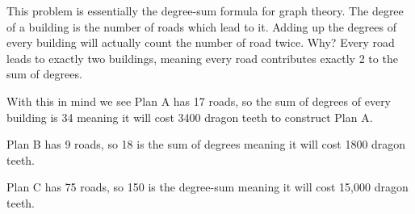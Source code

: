 


This problem is essentially the degree-sum formula for graph theory. The degree of a building is the number of roads which lead to it. Adding up the degrees of every building will actually count the number of road twice. Why? Every road leads to exactly two buildings, meaning every road contributes exactly 2 to the sum of degrees.

With this in mind we see Plan A has 17 roads, so the sum of degrees of every building is 34 meaning it will cost 3400 dragon teeth to construct Plan A.

Plan B has 9 roads, so 18 is the sum of degrees meaning it will cost 1800 dragon teeth.

Plan C has 75 roads, so 150 is the degree-sum meaning it will cost 15,000 dragon teeth.
